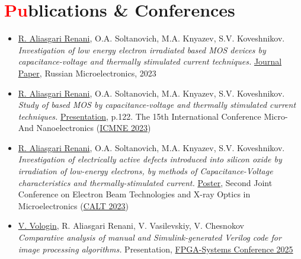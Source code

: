 \documentclass[a4paper, 11pt]{article}
\newcommand{\resumeSubHeadingListStart}{\begin{itemize}[leftmargin=0.0in, label={}]}
\newcommand{\resumeSubHeadingListEnd}{\end{itemize}}
\begin{document}
\section{{\textcolor{red}{Pu}blications} \& Conferences}
\resumeSubHeadingListStart
    \item \underline{R. Aliasgari Renani}, O.A. Soltanovich, M.A. Knyazev, S.V. Koveshnikov. \\ \textit{Investigation of low energy electron irradiated  based MOS devices by capacitance-voltage and thermally stimulated current techniques.} \href{https://doi.org/10.1134/S1063739723600516}{Journal Paper}, Russian Microelectronics, 2023
    \item \underline{R. Aliasgari Renani}, O.A. Soltanovich, M.A. Knyazev, S.V. Koveshnikov. \\ \textit{Study of  based MOS by capacitance-voltage and thermally stimulated current techniques.} \href{https://icmne.ftian.ru/wp-content/uploads/icmne-2023_e-version.pdf}{Presentation}, p.122. The 15th International Conference Micro- And Nanoelectronics (\href{https://icmne.ftian.ru}{ICMNE 2023})
    \item \underline{R. Aliasgari Renani}, O.A. Soltanovich, M.A. Knyazev, S.V. Koveshnikov. \\ \textit{Investigation of electrically active defects introduced into silicon oxide by irradiation of low-energy electrons, by methods of Capacitance-Voltage characteristics and thermally-stimulated current.} \href{https://cebt23.iptm.ru/download/numbered/91.pdf}{Poster}, Second Joint Conference on Electron Beam Technologies and X-ray Optics in Microelectronics (\href{https://cebt23.iptm.ru}{CALT 2023})
    \item \underline{V. Vologin}, R. Aliasgari Renani, V. Vasilevskiy, V. Chesnokov \\ \textit{Comparative analysis of manual and Simulink-generated Verilog code for image processing algorithms.} Presentation, \href{https://meetups.yadro.com/fpga-msk-1125/}{FPGA-Systems Conference 2025}
    
\resumeSubHeadingListEnd
\end{document}
